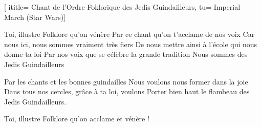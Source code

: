  [
ititle= {Chant de l'Ordre Foklorique des Jedis Guindailleurs},
tu= {Imperial March (Star Wars)}]

\beginverse
Toi, illustre Folklore qu’on vénère
Par ce chant qu’on t’acclame de nos voix
Car nous ici, nous sommes vraiment très fiers
De nous mettre ainsi à l’école qui nous donne ta loi
Par nos voix que se célèbre la grande tradition
Nous sommes des Jedis Guindailleurs
\endverse

\beginverse
Par les chants et les bonnes guindailles
Nous voulons nous former dans la joie
Dans tous nos cercles, grâce à ta loi, voulons
Porter bien haut le flambeau des Jedis Guindailleurs.
\endverse

\beginverse
Toi, illustre Folklore qu’on acclame et vénère !
\endverse

\endsong